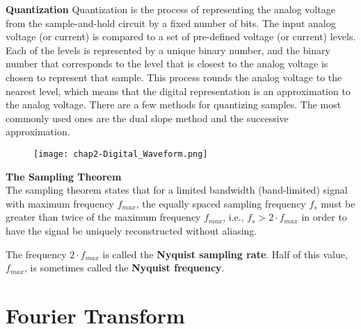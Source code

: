 \begin{compactitem}
\item \textbf{Quantization}
Quantization is the process of representing the analog voltage from the sample-and-hold circuit by a fixed number of bits. The input analog voltage (or current) is compared to a set of pre-defined voltage (or current) levels. Each of the levels is represented by a unique binary number, and the binary number that corresponds to the level that is closest to the analog voltage is chosen to represent that sample. This process rounds the analog voltage to the nearest level, which means that the digital representation is an approximation to the analog voltage. There are a few methods for quantizing samples. The most commonly used ones are the dual slope method and the successive approximation.

\begin{figure}[ht]
  \centering
    \texttt{[image: chap2-Digital\_Waveform.png]}
  \caption{}
  \label{fig:chap2-Digital_Waveform}
\end{figure}


\item \textbf{The Sampling Theorem}\cite{dsp-nyquist}\\
The sampling theorem states that for a limited bandwidth (band-limited) signal with maximum frequency $f_{max}$, the equally spaced sampling frequency $f_s$ must be greater than twice of the maximum frequency $f_{max}$, i.e.,
$f_s > 2·f_{max}$
in order to have the signal be uniquely reconstructed without aliasing.

The frequency $2·f_{max}$ is called the \textbf{Nyquist sampling rate}. Half of this value, $f_{max}$, is sometimes called the \textbf{Nyquist frequency}.

\end{compactitem}

\section{Fourier Transform} \cite{csulb-Woollett}

